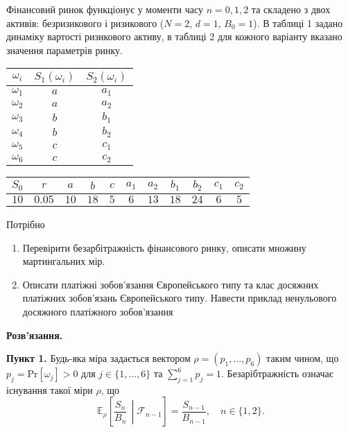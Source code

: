 \documentclass{test_template}
\begin{document}
\begin{problem}
    Фінансовий ринок функціонує у моменти часу $n=0,1,2$ та складено з двох
активів: безризикового і ризикового ($N=2$, $d=1$, $B_0=1$). В таблиці 1 задано
динаміку вартості ризикового активу, в таблиці 2 для кожного варіанту вказано
значення параметрів ринку.

    \begin{center}
        \begin{tabular}{|c|c|c|}
        \hline
        $\omega_i$ & $S_1(\omega_i)$ & $S_2(\omega_i)$ \\ \hline
        $\omega_1$ & $a$ & $a_1$ \\ \hline
        $\omega_2$ & $a$ & $a_2$ \\ \hline
        $\omega_3$ & $b$ & $b_1$ \\ \hline
        $\omega_4$ & $b$ & $b_2$ \\ \hline
        $\omega_5$ & $c$ & $c_1$ \\ \hline
        $\omega_6$ & $c$ & $c_2$ \\ \hline
        \end{tabular}
    \end{center}
        
    \begin{center}
        \begin{tabular}{|c|c|c|c|c|c|c|c|c|c|c|}
            \hline
            $S_0$ & $r$ & $a$ & $b$ & $c$ & $a_1$ & $a_2$ & $b_1$ & $b_2$ & $c_1$ & $c_2$ \\ \hline
            $10$ & $0.05$ & $10$ & $18$ & $5$ & $6$ & $13$ & $18$ & $24$ & $6$ & $5$ \\ \hline
        \end{tabular}
    \end{center}

    Потрібно
    \begin{enumerate}
        \item Перевірити безарбітражність фінансового ринку, описати множину
        мартингальних мір.
        \item Описати платіжні зобов’язання Європейського типу та клас досяжних
платіжних зобов’язань Європейського типу. Навести приклад ненульового досяжного
платіжного зобов’язання
    \end{enumerate}
\end{problem}

\textbf{Розв'язання.} 

\textbf{Пункт 1.} Будь-яка міра задається вектором $\rho = (p_1,\dots,p_6)$
таким чином, що $p_j=\text{Pr}[\omega_j] > 0$ для $j \in \{1,\dots,6\}$ та
$\sum_{j=1}^6 p_j=1$. Безарібтражність означає існування такої міри $\rho$, що
\begin{equation*}
    \mathbb{E}_{\rho}\left[\frac{S_n}{B_n} \, \middle| \mathcal{F}_{n-1}\right] = \frac{S_{n-1}}{B_{n-1}}, \quad n \in \{1,2\}.
\end{equation*}
\end{document}
